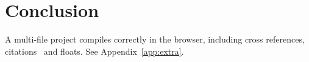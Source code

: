 \chapter{Conclusion}\label{ch:conclusion}

A multi-file project compiles correctly in the browser, including cross references,
citations~\cite{knuth1984,lamport1994} and floats. See Appendix~\ref{app:extra}.
